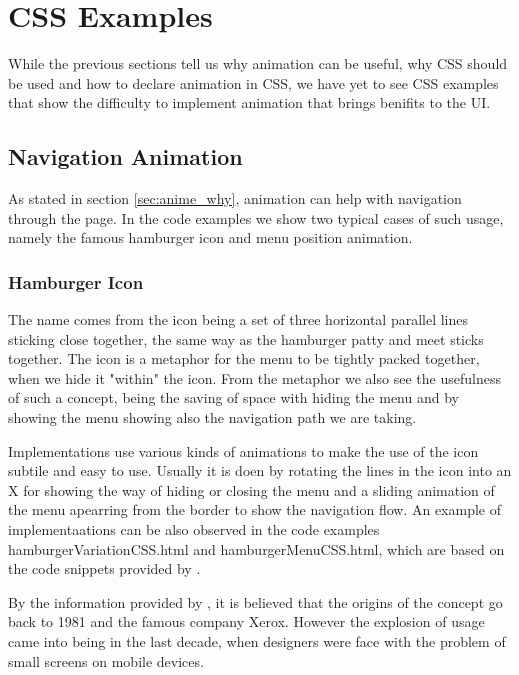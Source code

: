 

\section{CSS Examples} %
\label{sec:CSS_Examples}

While the previous sections tell us why animation can be useful, why CSS should be used and how to declare animation in CSS, we have yet to see CSS examples that show the difficulty to implement animation that brings benifits to the UI.

\subsection{Navigation Animation} %
\label{sub:navigationCSS}

As stated in section \ref{sec:anime_why}, animation can help with navigation through the page. In the code examples we show two typical cases of such usage, namely the famous hamburger icon and menu position animation.

\subsubsection{Hamburger Icon} %
\label{subsub:hamburger}

The name comes from the icon being a set of three horizontal parallel lines sticking close together, the same way as the hamburger patty and meet sticks together. The icon is a metaphor for the menu to be tightly packed together, when we hide it "within" the icon. From the metaphor we also see the usefulness of such a concept, being the saving of space with hiding the menu and by showing the menu showing also the navigation path we are taking.

Implementations use various kinds of animations to make the use of the icon subtile and easy to use. Usually it is doen by rotating the lines in the icon into an X for showing the way of hiding or closing the menu and a sliding animation of the menu apearring from the border to show the navigation flow. An example of implementaations can be also observed in the code examples hamburgerVariationCSS.html and hamburgerMenuCSS.html, which are based on the code snippets provided by \citet{hamburgerMenu,hamburgerVar}.

By the information provided by \citet{vtldesign}, it is believed that the origins of the concept go back to 1981 and the famous company Xerox. However the explosion of usage came into being in the last decade, when designers were face with the problem of small screens on mobile devices.

